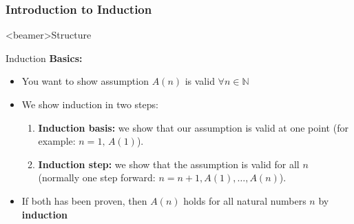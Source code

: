 \subsubsection{Introduction to Induction}

\begin{frame}<beamer>{Structure}
\end{frame}

\begin{frame}{Induction}
  \textbf{Basics:}
  \begin{itemize}
    \item<2- | handout:1>
      You want to show assumption $A(n)$ is valid $\forall n \in \mathbb{N}$
    \item<3- | handout:1>
      We show induction in two steps:
      \begin{enumerate}
        \item<4- | handout:1>
          \textbf{Induction basis:} we show that our assumption is valid 
          at one point (for example: $n = 1, \, A(1)$).
        \item<5- | handout:1>
          \textbf{Induction step:} we show that the assumption is valid for 
          all $n$ (normally one step forward: $n = n + 1, A(1), \ldots, A(n)$).
      \end{enumerate}
    \item<6- | handout:1>
      If both has been proven, then {\color{MainA}$A(n)$} holds for all natural
      numbers {\color{MainA}$n$} by \textbf{induction}
  \end{itemize}
\end{frame}


